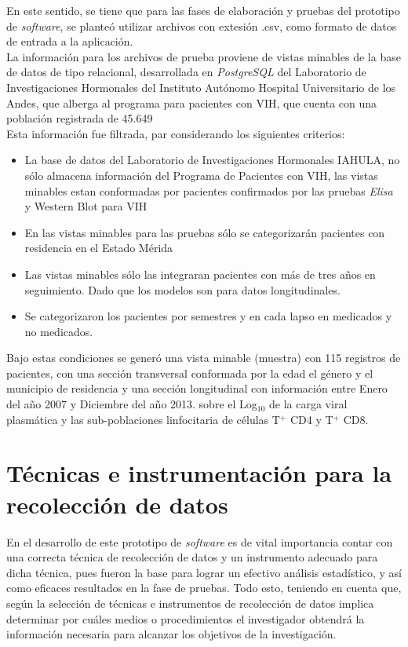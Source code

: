 En este sentido, se tiene que para las fases de elaboraci\'on y pruebas del prototipo de \textit{software}, se plante\'o utilizar archivos con extesi\'on .csv, como formato de datos de entrada a la aplicaci\'on.\\

La informaci\'on para los archivos de prueba proviene de vistas minables de la base de datos de tipo relacional, desarrollada en \textit{PostgreSQL} del Laboratorio de Investigaciones Hormonales del Instituto Aut\'onomo Hospital Universitario de los Andes, que alberga al programa para pacientes con VIH, que cuenta con una poblaci\'on registrada de 45.649\\

Esta informaci\'on fue  filtrada, par considerando los siguientes criterios:\\
\begin{itemize}
    \item La base de datos del Laboratorio de Investigaciones Hormonales IAHULA, no s\'olo almacena informaci\'on del Programa de Pacientes con VIH, las vistas minables estan conformadas por pacientes confirmados por las pruebas \textit{Elisa} y {Western Blot} para VIH
    \item En las vistas minables para  las pruebas s\'olo se categorizar\'an pacientes con residencia en el Estado Mérida
    \item Las vistas minables s\'olo las integraran pacientes con m\'as de tres años en seguimiento. Dado que los modelos son para datos longitudinales.
    \item Se categorizaron los pacientes por semestres y en cada lapso en medicados y no medicados.
\end{itemize}

Bajo estas condiciones se generó una vista minable (muestra) con 115 registros de pacientes, con una secci\'on transversal conformada por la edad el g\'enero y el municipio de residencia  y una secci\'on longitudinal con  informaci\'on entre Enero del año 2007 y Diciembre del año 2013. sobre el Log$_{10}$ de la carga viral plasm\'atica y las sub-poblaciones linfocitaria de c\'elulas T$^{+}$ CD4 y  T$^{+}$ CD8.\\

\section{T\'ecnicas e instrumentaci\'on para la recolecci\'on de datos}

En el desarrollo de este prototipo de \textit{software} es de vital importancia contar con una correcta t\'ecnica de recolecci\'on de datos y un instrumento adecuado para dicha t\'ecnica, pues fueron la base para lograr un efectivo an\'alisis estad\'istico, y as\'i como eficaces resultados en la fase de pruebas. Todo esto, teniendo en cuenta que, seg\'un \citet{hurtado} la selecci\'on de t\'ecnicas e instrumentos de recolecci\'on de datos implica determinar por cu\'ales medios o procedimientos el investigador obtendr\'a la informaci\'on necesaria para alcanzar los objetivos de la investigaci\'on.\\

